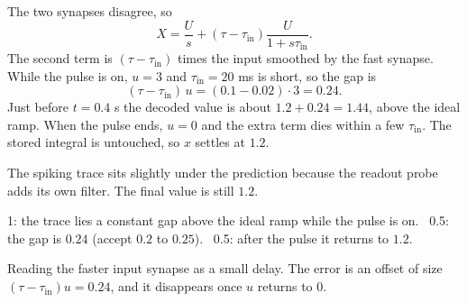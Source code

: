 \documentclass[11pt,letterpaper]{article}
\newcommand{\tin}{\tau_{\mathrm{in}}}
\newcommand{\ans}[1]{\par\vspace{4pt}{\bfseries #1}\quad}
\begin{document}
\ans{(b) [2]}
The two synapses disagree, so
\[
X = \frac{U}{s} + (\tau - \tin)\frac{U}{1 + s\tin}.
\]
The second term is $(\tau - \tin)$ times the input smoothed by the fast synapse. While the pulse is on, $u = 3$ and $\tin = 20$ ms is short, so the gap is
\[
(\tau - \tin)\,u = (0.1 - 0.02)\cdot 3 = \mathbf{0.24}.
\]
Just before $t = 0.4$ s the decoded value is about $1.2 + 0.24 = 1.44$, above the ideal ramp. When the pulse ends, $u = 0$ and the extra term dies within a few $\tin$. The stored integral is untouched, so $x$ settles at $\mathbf{1.2}$.
\begin{center}
\end{center}
The spiking trace sits slightly under the prediction because the readout probe adds its own filter. The final value is still $1.2$.
\begin{marking}
1: the trace lies a constant gap above the ideal ramp while the pulse is on. \ 0.5: the gap is $0.24$ (accept $0.2$ to $0.25$). \ 0.5: after the pulse it returns to $1.2$.
\end{marking}
\begin{trap}
Reading the faster input synapse as a small delay. The error is an offset of size $(\tau - \tin)u = 0.24$, and it disappears once $u$ returns to $0$.
\end{trap}
\end{document}
